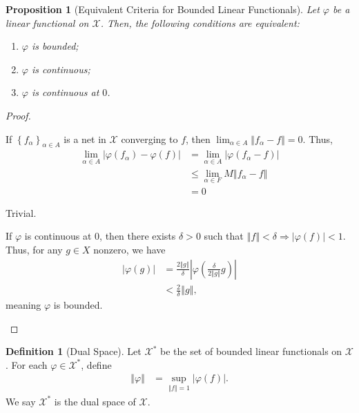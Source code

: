 \documentclass[12pt]{extarticle}
\newcommand{\norm}[1]{\left\Vert #1\right\Vert}
\newcommand{\set}[1]{\left\{#1\right\}}
\theoremstyle{plain}
\newtheorem*{proposition}{Proposition}
\theoremstyle{definition}
\newtheorem*{definition}{Definition}
\theoremstyle{note}
\begin{document}
\begin{proposition}[Equivalent Criteria for Bounded Linear Functionals]
Let $\varphi$ be a linear functional on $\mathcal{X}$. Then, the following conditions are equivalent:
\begin{enumerate}[(1)]
  \item $\varphi$ is bounded;
  \item $\varphi$ is continuous;
  \item $\varphi$ is continuous at $0$.
\end{enumerate}
\end{proposition}
\begin{proof}
  \begin{description}[font=\normalfont]
    \item[$(1)\Rightarrow (2)$:] If $\set{f_{\alpha}}_{\alpha \in A}$ is a net in $\mathcal{X}$ converging to $f$, then $\lim_{\alpha \in A}\norm{f_{\alpha} - f} = 0$. Thus,
      \begin{align*}
        \lim_{\alpha \in A}\left\vert \varphi\left(f_{\alpha}\right)-  \varphi\left(f\right) \right\vert &= \lim_{\alpha \in A}\left\vert \varphi(f_{\alpha} - f) \right\vert\\
                                                                                                         &\leq \lim_{\alpha \in F}M\norm{f_{\alpha} - f}\\
                                                                                                         &= 0
      \end{align*}
    \item[$(2)\Rightarrow (3)$:] Trivial.
    \item[$(3) \Rightarrow (1)$:] If $\varphi$ is continuous at $0$, then there exists $\delta > 0$ such that $\norm{f} < \delta \Rightarrow \left\vert \varphi(f) \right\vert < 1$. Thus, for any $g\in X$ nonzero, we have
      \begin{align*}
        \left\vert \varphi\left(g\right) \right\vert &= \frac{2\norm{g}}{\delta}\left\vert \varphi\left(\frac{\delta}{2\norm{g}}g\right) \right\vert\\
                                                     &< \frac{2}{\delta}\norm{g},
      \end{align*}
      meaning $\varphi$ is bounded.
  \end{description}
\end{proof}
\begin{definition}[Dual Space]
  Let $\mathcal{X}^{\ast}$ be the set of bounded linear functionals on $\mathcal{X}$. For each $\varphi \in \mathcal{X}^{\ast}$, define
  \begin{align*}
    \norm{\varphi} &= \sup_{\norm{f} = 1} \left\vert \varphi(f) \right\vert.
  \end{align*}
  We say $\mathcal{X}^{\ast}$ is the dual space of $\mathcal{X}$.
\end{definition}
\end{document}
